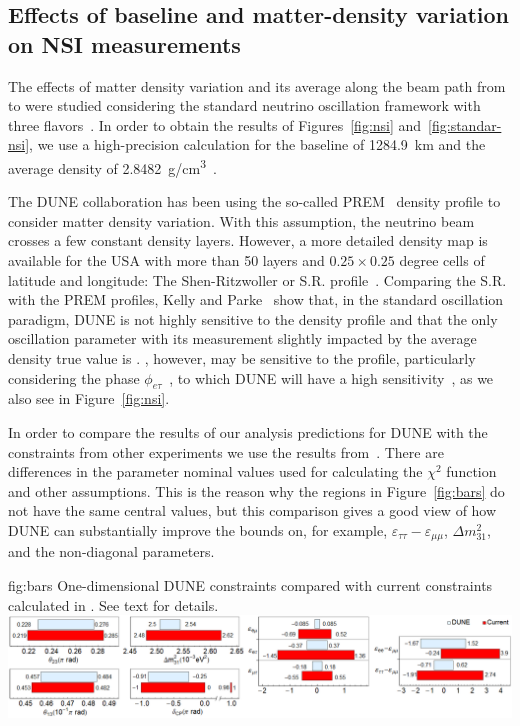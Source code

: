 \subsection{Effects of baseline and matter-density variation on  NSI measurements}\label{ssec:matter}
The effects of matter density variation and its average along the beam path from \fnal to \surf  were studied considering the standard neutrino oscillation framework with three flavors~\cite{Roe:2017zdw,Kelly:2018kmb}. In order to obtain the results of Figures~\ref{fig:nsi} and~\ref{fig:standar-nsi}, we use a high-precision calculation for the baseline of \SI{1284.9}{km} and the average density of \SI{2.8482}{g/cm^3}~\cite{Roe:2017zdw}.

The DUNE collaboration has been using the so-called PREM~\cite{Dziewonski:1981xy,PREM2} density profile to consider matter density variation. With this assumption, the neutrino beam crosses a few constant density layers.
However, a more detailed density map is available for the USA with more than 50 layers and $0.25 \times 0.25$ degree cells of latitude and longitude: The Shen-Ritzwoller or S.R. profile~\cite{SR:2016,Roe:2017zdw}. Comparing the S.R. with the PREM profiles, Kelly and Parke~\cite{Kelly:2018kmb} show that, in the standard oscillation paradigm, DUNE is not highly sensitive to the density profile and that the only oscillation parameter with its measurement slightly impacted by the average density true value is \deltacp{}.
, however, may be sensitive to the profile, particularly considering the phase $\phi_{e\tau}$~\cite{Chatterjee:2018dyd}, to which DUNE will have a high sensitivity~\cite{Ohlsson:2012kf,Miranda:2015dra,deGouvea:2015ndi,Coloma:2015kiu,Farzan:2017xzy}, as we also see in Figure~\ref{fig:nsi}.

In order to compare the results of our analysis predictions for DUNE with the constraints from other experiments we use the results from~\cite{Farzan:2017xzy}. There are differences in the parameter nominal values used for calculating the $\chi^2$ function and other assumptions. This is the reason why the regions in Figure~\ref{fig:bars} do not have the same central values, but this comparison gives a good view of how DUNE can substantially improve the bounds on, for example, $\varepsilon_{\tau\tau}-\varepsilon_{\mu\mu}$, $\Delta m^2_{31}$, and the non-diagonal  parameters.

\begin{dunefigure}
{fig:bars}
{One-dimensional DUNE constraints compared with current constraints calculated in \cite{Farzan:2017xzy}. See text for details.}
\includegraphics[width=1.0\columnwidth]{graphics/Barras_Geral_dune.png}
\end{dunefigure}


